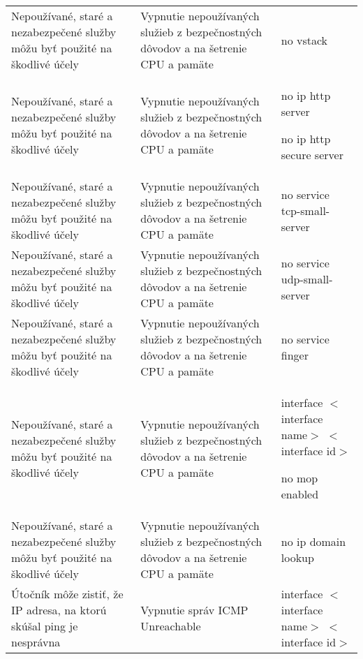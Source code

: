 \begin{longtable}[!htbp]{|L{10em}L{10em}>{\selectfont}L{34em}|}
	Nepoužívané, staré a nezabezpečené služby môžu byť použité na škodlivé účely	&Vypnutie nepoužívaných služieb z bezpečnostných dôvodov a na šetrenie CPU a pamäte 	&no vstack\\
	
	
	
	 Nepoužívané, staré a nezabezpečené služby môžu byť použité na škodlivé účely	&Vypnutie nepoužívaných služieb z bezpečnostných dôvodov a na šetrenie CPU a pamäte 	&no ip http server
	
	no ip http secure server\\
	
	
	
	Nepoužívané, staré a nezabezpečené služby môžu byť použité na škodlivé účely	&Vypnutie nepoužívaných služieb z bezpečnostných dôvodov a na šetrenie CPU a pamäte 	&no service tcp-small-server\\
	
	
	
	
	 Nepoužívané, staré a nezabezpečené služby môžu byť použité na škodlivé účely	&Vypnutie nepoužívaných služieb z bezpečnostných dôvodov a na šetrenie CPU a pamäte 	&no service udp-small-server\\
	
	
	
	Nepoužívané, staré a nezabezpečené služby môžu byť použité na škodlivé účely	&Vypnutie nepoužívaných služieb z bezpečnostných dôvodov a na šetrenie CPU a pamäte 	&no service finger\\
	
	
	
	
	 Nepoužívané, staré a nezabezpečené služby môžu byť použité na škodlivé účely	&Vypnutie nepoužívaných služieb z bezpečnostných dôvodov a na šetrenie CPU a pamäte 	&interface $<$interface name$>$ $<$interface id$>$
	
	\hspace{0.5em} no mop enabled\\
	
	
	
	Nepoužívané, staré a nezabezpečené služby môžu byť použité na škodlivé účely	&Vypnutie nepoužívaných služieb z bezpečnostných dôvodov a na šetrenie CPU a pamäte 	&no ip domain lookup\\
	
	
	
	 Útočník môže zistiť, že IP adresa, na ktorú skúšal ping je nesprávna	&Vypnutie správ ICMP Unreachable	&interface $<$interface name$>$ $<$interface id$>$
	

\end{longtable}
